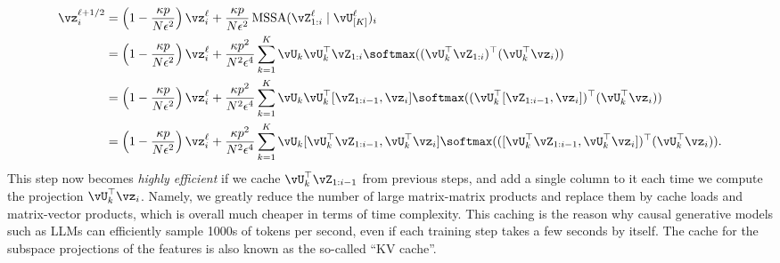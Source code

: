 \documentclass[../../book-main.tex]{subfiles}
\begin{document}
\begin{align}
    \vz_{i}^{\ell + 1/2}
    &= \left(1 - \frac{\kappa p}{N\epsilon^{2}}\right)\vz_{i}^{\ell} + \frac{\kappa p}{N \epsilon^{2}}\operatorname{MSSA}(\vZ_{1:i}^{\ell} \mid \vU_{[K]}^{\ell})_{i} \\ 
    &= \left(1 - \frac{\kappa p}{N\epsilon^{2}}\right)\vz_{i}^{\ell} + \frac{\kappa p^{2}}{N^{2} \epsilon^{4}}\sum_{k =  1}^{K}\vU_{k}\vU_{k}^{\top}\vZ_{1:i}\softmax((\vU_{k}^{\top}\vZ_{1:i})^{\top}(\vU_{k}^{\top}\vz_{i})) \\
    &= \left(1 - \frac{\kappa p}{N\epsilon^{2}}\right)\vz_{i}^{\ell} + \frac{\kappa p^{2}}{N^{2} \epsilon^{4}}\sum_{k =  1}^{K}\vU_{k}\vU_{k}^{\top}[\vZ_{1:i-1}, \vz_{i}]\softmax((\vU_{k}^{\top}[\vZ_{1:i-1}, \vz_{i}])^{\top}(\vU_{k}^{\top}\vz_{i})) \\
    &= \left(1 - \frac{\kappa p}{N\epsilon^{2}}\right)\vz_{i}^{\ell} + \frac{\kappa p^{2}}{N^{2} \epsilon^{4}}\sum_{k =  1}^{K}\vU_{k}[\vU_{k}^{\top}\vZ_{1:i-1}, \vU_{k}^{\top}\vz_{i}]\softmax(([\vU_{k}^{\top}\vZ_{1:i-1}, \vU_{k}^{\top}\vz_{i}])^{\top}(\vU_{k}^{\top}\vz_{i})).
\end{align} 
This step now becomes \textit{highly efficient} if we cache \(\vU_{k}^{\top}\vZ_{1:i-1}\) from previous steps, and add a single column to it each time we compute the projection \(\vU_{k}^{\top}\vz_{i}\). Namely, we greatly reduce the number of large matrix-matrix products and replace them by cache loads and matrix-vector products, which is overall much cheaper in terms of time complexity. This caching is the reason why causal generative models such as LLMs can efficiently sample 1000s of tokens per second, even if each training step takes a few seconds by itself. The cache for the subspace projections of the features is also known as the so-called ``KV cache''.
\end{document}
